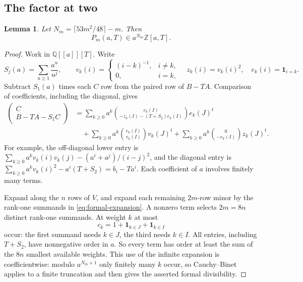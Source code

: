 \documentclass{amsart}
\newtheorem{lemma}{Lemma}[section]
\numberwithin{equation}{section}
\numberwithin{table}{section}
\newcommand{\Z}{\mathbb{Z}}
\begin{document}
\subsection{The factor at two}
\begin{lemma}\label{lem:formal-divisor}
Let $N_m=\lceil53m^2/48\rceil-m$. Then
\begin{equation}\label{eq:formal-divisor}
 P_m(a,T)\in a^{N_m}\Z[a,T].
\end{equation}
\end{lemma}
\begin{proof}
Work in $\mathbb Q[[a]][T]$. Write
\[
 S_j(a)=\sum_{u\ge1}\frac{a^u}{u^j},\qquad
 v_k(i)=\begin{cases}(i-k)^{-1},&i\ne k,\\0,&i=k,\end{cases}
 \quad z_k(i)=v_k(i)^2,\quad e_k(i)=\mathbf1_{i=k}.
\]
Subtract $S_1(a)$ times each $C$ row from the paired row of $B-TA$.
Comparison of coefficients, including the diagonal, gives
\begin{equation}\label{eq:formal-expansion}
\begin{aligned}
\begin{pmatrix}C\\B-TA-S_1C\end{pmatrix}
&=\sum_{k\ge0}a^k
 \binom{v_k(I)}{-z_k(I)-(T+S_2)e_k(I)}e_k(J)^t\\
&\quad+\sum_{k\ge0}a^k\binom{e_k(I)}{v_k(I)}v_k(J)^t
 +\sum_{k\ge0}a^k\binom{0}{-e_k(I)}z_k(J)^t.
\end{aligned}
\end{equation}
For example, the off-diagonal lower entry is
$\sum_{k\ge0}a^kv_k(i)v_k(j)-(a^i+a^j)/(i-j)^2$, and the diagonal entry is
$\sum_{k\ge0}a^kv_k(i)^2-a^i(T+S_2)=b_i-Ta^i$. Each coefficient of $a$
involves finitely many terms.

Expand along the $n$ rows of $V$, and expand each remaining $2m$-row minor
by the rank-one summands in \eqref{eq:formal-expansion}. A nonzero term
selects $2m=8n$ distinct rank-one summands. At weight $k$ at most
\begin{equation*}
 c_k=1+\mathbf1_{k\in J}+\mathbf1_{k\in I}
\end{equation*}
occur: the first summand needs $k\in J$, the third needs $k\in I$. All
entries, including $T+S_2$, have nonnegative order in $a$. So every term
has order at least the sum of the $8n$ smallest available weights.
This use of the infinite expansion is coefficientwise: modulo
$a^{N_m+1}$ only finitely many $k$ occur, so Cauchy--Binet applies to a
finite truncation and then gives the asserted formal divisibility.


\end{proof}
\end{document}
